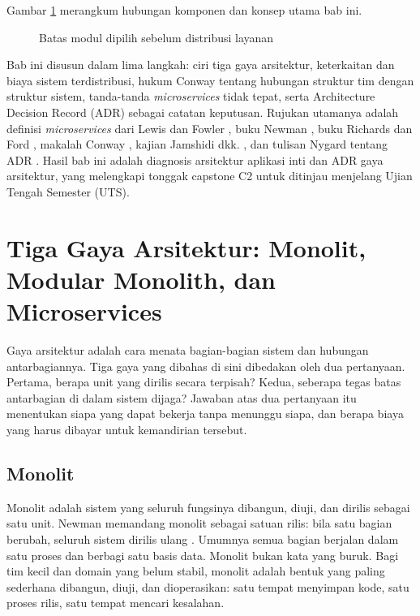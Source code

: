 Gambar \ref{fig:ch07-tiga-kawasan} merangkum hubungan komponen dan konsep utama bab ini.
\begin{figure}[!htb]
  \centering
  
  \caption{Batas modul dipilih sebelum distribusi layanan}
  \label{fig:ch07-tiga-kawasan}
\end{figure}

Bab ini disusun dalam lima langkah: ciri tiga gaya arsitektur, keterkaitan dan biaya sistem
terdistribusi, hukum Conway tentang hubungan struktur tim dengan struktur sistem, tanda-tanda
\textit{microservices} tidak tepat, serta Architecture Decision Record (ADR) sebagai catatan
keputusan. Rujukan utamanya adalah definisi \textit{microservices} dari Lewis dan Fowler
\cite{lewis-fowler2014}, buku Newman \cite{newman2021}, buku Richards dan Ford \cite{richards2025},
makalah Conway \cite{conway1968}, kajian Jamshidi dkk. \cite{jamshidi2018}, dan tulisan Nygard
tentang ADR \cite{c07-nygard2011}. Hasil bab ini adalah diagnosis arsitektur aplikasi inti dan ADR
gaya arsitektur, yang melengkapi tonggak capstone C2 untuk ditinjau menjelang Ujian Tengah Semester
(UTS).

\section{Tiga Gaya Arsitektur: Monolit, Modular Monolith, dan Microservices}
\label{sec:ch07-tiga-gaya}

Gaya arsitektur adalah cara menata bagian-bagian sistem dan hubungan antarbagiannya. Tiga gaya yang
dibahas di sini dibedakan oleh dua pertanyaan. Pertama, berapa unit yang dirilis secara terpisah?
Kedua, seberapa tegas batas antarbagian di dalam sistem dijaga? Jawaban atas dua pertanyaan itu
menentukan siapa yang dapat bekerja tanpa menunggu siapa, dan berapa biaya yang harus dibayar untuk
kemandirian tersebut.

\subsection{Monolit}

Monolit adalah sistem yang seluruh fungsinya dibangun, diuji, dan dirilis sebagai satu unit. Newman
memandang monolit sebagai satuan rilis: bila satu bagian berubah, seluruh sistem dirilis ulang
\cite{newman2021}. Umumnya semua bagian berjalan dalam satu proses dan berbagi satu basis data.
Monolit bukan kata yang buruk. Bagi tim kecil dan domain yang belum stabil, monolit adalah bentuk
yang paling sederhana dibangun, diuji, dan dioperasikan: satu tempat menyimpan kode, satu proses
rilis, satu tempat mencari kesalahan.

